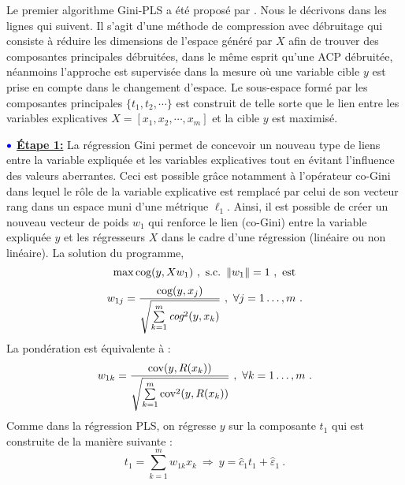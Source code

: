 Le premier algorithme Gini-PLS a été proposé par \citet{mussard2018ginipls}. Nous le décrivons dans les lignes qui suivent. Il s'agit d'une méthode de compression avec débruitage qui consiste à réduire les dimensions de l'espace généré par $X$ afin de trouver des composantes principales débruitées, dans le même esprit qu'une ACP débruitée, néanmoins l'approche est supervisée dans la mesure où une variable cible $y$ est prise en compte dans le changement d'espace. Le sous-espace formé par les composantes principales $\{t_1,t_2,\cdots\}$ est construit de telle sorte que le lien entre les variables explicatives $X = [x_1,x_2,\cdots, x_m]$ et la cible $y$ est maximisé. 

\medskip

$\bulle$ \underline{\textbf{Étape 1:}} La régression Gini permet de concevoir un nouveau type de liens entre la variable expliquée et les variables explicatives tout en évitant l'influence des valeurs aberrantes. Ceci est possible grâce notamment à l'opérateur co-Gini dans lequel le rôle de la variable explicative est remplacé par celui de son vecteur rang dans un espace muni d'une métrique $\ell_1$. Ainsi, il est possible de créer un nouveau vecteur de poids $w_1$ qui renforce le lien (co-Gini) entre la variable expliquée $y$ et les régresseurs $X$ dans le cadre d'une régression (linéaire ou non linéaire).
\newline La solution du programme,
\[
\max \cog(y,X w_1) \ , \ \text{s.c.} \ \left\|w_1\right\|=1 \ , \ \text{est}
\]
\begin{equation}\notag
w_{1j} = \frac{\text{cog}(y,x_j)}{\sqrt{\sum\limits_{k=1}^m \emph{cog}^2(y,x_k)}} \ , \ \forall j = 1\ldots,m \ .
\end{equation}
La pondération est équivalente à :
\begin{equation}\notag
w_{1k} = \frac{\text{cov}(y,R(x_k))}{\sqrt{\sum\limits_{k=1}^m \text{cov}^2(y,R(x_k))}} \ , \ \forall k = 1\ldots,m \ .
\end{equation}
Comme dans la régression PLS, on régresse $y$ sur la composante $t_1$ qui est construite de la manière suivante :
\[
t_1 = \sum_{k=1}^m w_{1k}x_k \ \Longrightarrow \ y = \hat{c}_1 t_1 + \hat{\varepsilon}_1 \ .
\]

\medskip


